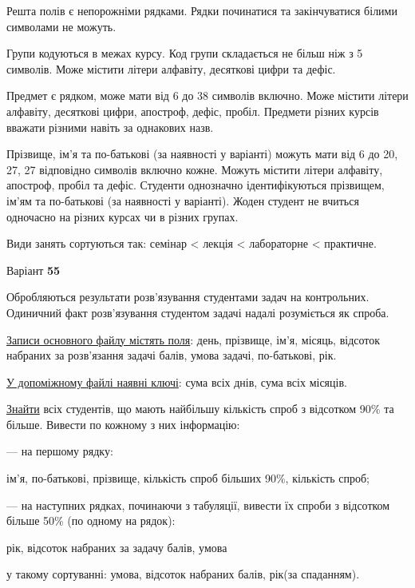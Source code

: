 \documentclass[11pt, ukrainian]{article}
\begin{document}
Решта полів є непорожніми рядками.
Рядки починатися та закінчуватися білими символами не можуть.

Групи кодуються в межах курсу.
Код групи складається не більш ніж з 5 символів.
Може містити літери алфавіту, десяткові цифри та дефіс.

Предмет є рядком, може мати від 6 до 38 символів включно.
Може містити літери алфавіту, десяткові цифри, апостроф, дефіс, пробіл.
Предмети різних курсів вважати різними навіть за однакових назв.

Прізвище, ім’я та по-батькові (за наявності у варіанті)
можуть мати від 6 до 20, 27, 27 відповідно символів включно кожне.
Можуть містити літери алфавіту, апостроф, пробіл та дефіс.
Студенти однозначно ідентифікуються прізвищем, ім’ям та по-батькові (за наявності у варіанті).
Жоден студент не вчиться одночасно на різних курсах чи в різних групах.

Види занять сортуються так: семінар < лекція < лабораторне < практичне.





\par
\newpage
{\center Варіант  \No \textbf { 55 }\par}
\bigskip
Обробляються результати розв’язування студентами задач на контрольних.
Одиничний факт роз\-в’я\-зу\-вання студентом задачі надалі розуміється як спроба.

\underline{Записи основного файлу містять поля}: день, прізвище, ім’я, місяць, відсоток набраних за розв’язан\-ня задачі балів, умова задачі, по-батькові, рік.

\underline{У допоміжному файлі наявні ключі}: сума всіх днів, сума всіх місяців.

\underline{Знайти} всіх студентів, що мають найбільшу кількість спроб з відсотком 90\% та більше. Вивести по кожному з них інформацію:\par
{\noindent}--- на першому рядку:\par
ім’я, по-батькові, прізвище, кількість спроб більших 90\%, кількість спроб;

{\noindent}--- на наступних рядках, починаючи з табуляції, вивести їх спроби з відсотком більше 50\% (по одному на рядок):\par
рік, відсоток набраних за задачу балів, умова

{\noindent}у такому сортуванні: умова, відсоток набраних балів, рік(за спаданням).
\end{document}
